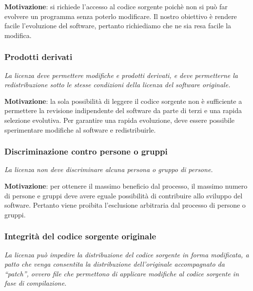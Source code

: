\textbf{Motivazione}: si richiede l'accesso al codice sorgente poichè non si può far evolvere un programma senza poterlo modificare. Il nostro obiettivo è rendere facile l'evoluzione del software, pertanto richiediamo che ne sia resa facile la modifica.

\subsubsection{Prodotti derivati}

\begin{center}

\textit{La licenza deve permettere modifiche e prodotti derivati, e deve permetterne la redistribuzione sotto le stesse condizioni della licenza del software originale.}

\end{center}

\textbf{Motivazione}: la sola possibilità di leggere il codice sorgente non è sufficiente a permettere la revisione indipendente del software da parte di terzi e una rapida selezione evolutiva. Per garantire una rapida evoluzione, deve essere possibile sperimentare modifiche al software e redistribuirle.

\subsubsection{Discriminazione contro persone o gruppi}

\begin{center}

\textit{La licenza non deve discriminare alcuna persona o gruppo di persone.}

\end{center}

\textbf{Motivazione}: per ottenere il massimo beneficio dal processo, il massimo numero di persone e gruppi deve avere eguale possibilità di contribuire allo sviluppo del software. Pertanto viene proibita l'esclusione arbitraria dal processo di persone o gruppi.

\subsubsection{Integrità del codice sorgente originale}

\begin{center}

\textit{La licenza può impedire la distribuzione del codice sorgente in forma modificata, a patto che venga consentita la distribuzione dell'originale accompagnato da ``patch'', ovvero file che permettono di applicare modifiche al codice sorgente in fase di compilazione.}

\end{center}

